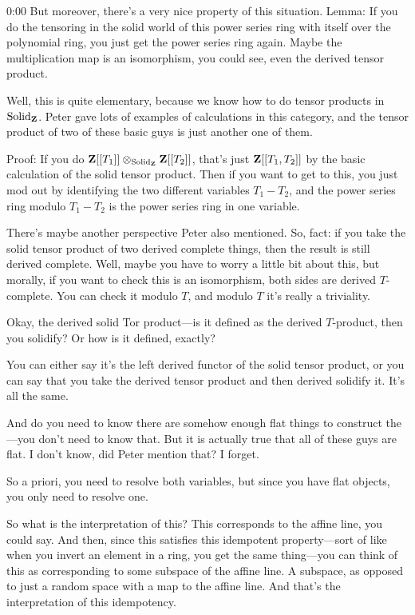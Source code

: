 \begin{unfinished}{0:00}
But moreover, there's a very nice property of this situation. Lemma: If you do the tensoring in the solid world of this power series ring with itself over the polynomial ring, you just get the power series ring again. Maybe the multiplication map is an isomorphism, you could see, even the derived tensor product.

Well, this is quite elementary, because we know how to do tensor products in $\mathrm{Solid}_\mathbf Z$. Peter gave lots of examples of calculations in this category, and the tensor product of two of these basic guys is just another one of them. 

Proof: If you do $\mathbf Z[[T_1]] \otimes_{\mathrm{Solid}_\mathbf Z} \mathbf Z[[T_2]]$, that's just $\mathbf Z[[T_1, T_2]]$ by the basic calculation of the solid tensor product. Then if you want to get to this, you just mod out by identifying the two different variables $T_1 - T_2$, and the power series ring modulo $T_1 - T_2$ is the power series ring in one variable.

There's maybe another perspective Peter also mentioned.
So, fact: if you take the solid tensor product of two derived complete things, then the result is still derived complete. Well, maybe you have to worry a little bit about this, but morally, if you want to check this is an isomorphism, both sides are derived $T$-complete. You can check it modulo $T$, and modulo $T$ it's really a triviality.

Okay, the derived solid Tor product---is it defined as the derived $T$-product, then you solidify? Or how is it defined, exactly?

You can either say it's the left derived functor of the solid tensor product, or you can say that you take the derived tensor product and then derived solidify it. It's all the same.

And do you need to know there are somehow enough flat things to construct the---you don't need to know that. But it is actually true that all of these guys are flat. I don't know, did Peter mention that? I forget.

So a priori, you need to resolve both variables, but since you have flat objects, you only need to resolve one.

So what is the interpretation of this? This corresponds to the affine line, you could say. And then, since this satisfies this idempotent property---sort of like when you invert an element in a ring, you get the same thing---you can think of this as corresponding to some subspace of the affine line. A subspace, as opposed to just a random space with a map to the affine line. And that's the interpretation of this idempotency.


\end{unfinished}
